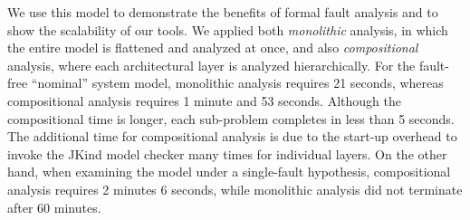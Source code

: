 

We use this model to demonstrate the benefits of formal fault analysis and to show the scalability of our tools.  We applied both {\em monolithic} analysis, in which the entire model is flattened and analyzed at once, and also {\em compositional} analysis, where each architectural layer is analyzed hierarchically.
For the fault-free ``nominal'' system model, monolithic analysis requires 21 seconds, whereas compositional analysis requires 1 minute and 53 seconds.  Although the compositional time is longer, each sub-problem completes in less than 5 seconds.  The additional time for compositional analysis is  due to the start-up overhead to invoke the JKind model checker many times for individual layers.  On the other hand, when examining the model under a single-fault hypothesis, compositional analysis requires 2 minutes 6 seconds, while monolithic analysis did not terminate after 60 minutes.


